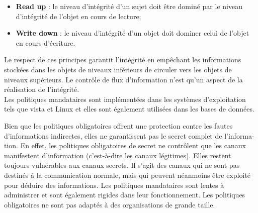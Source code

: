 \begin{itemize}
\item \textbf{Read up} : le niveau d'intégrité d'un sujet doit être dominé par le niveau d'intégrité de l'objet en cours de lecture;
\item \textbf{Write down} : le niveau d'intégrité d'un objet doit dominer celui de l'objet en cours d'écriture.
\end{itemize}
\hspace*{0.5cm} Le respect de ces principes garantit l'intégrité en empêchant les informations stockées dans les objets de niveaux inférieurs de circuler vers les objets de niveaux supérieurs. Le contrôle de flux d'information n'est qu'un aspect de la réalisation de l'intégrité.\\
\hspace*{0.5cm} Les politiques mandataires sont implémentées dans les systèmes d'exploitation tels que vista et Linux et elles sont également utilisées dans les bases de données.


\label{sectionVulnérabilitéMAC}

Bien que les politiques obligatoires offrent une protection contre les fautes d'informations indirectes, elles ne garantissent pas le secret complet de l'informa-tion. En effet, les politiques obligatoires de secret ne contrôlent que les canaux manifestent d'information (c'est-à-dire les canaux légitimes). Elles restent toujours vulnérables aux canaux secrets. Il s'agit des canaux qui ne sont pas destinés à la communication normale, mais qui peuvent néanmoins être exploité pour déduire des informations. 
Les politiques mandataires sont lentes à administrer et sont également rigides dans leur fonctionnement. Les politiques obligatoires ne sont pas adaptés à des organisations de grande taille.

\label{sectionRole}

\label{sectionRBAC}

